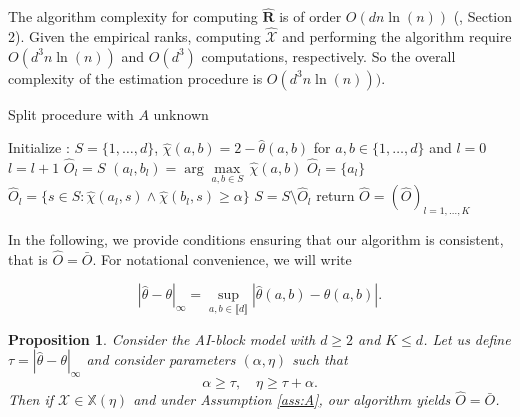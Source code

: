 \documentclass[11pt]{article}
\newtheorem{proposition}{Proposition}
\theoremstyle{definition}
\begin{document}
	The algorithm complexity for computing $\hat{\textbf{R}}$ is of order $O(dn \ln(n))$ (\cite{cormen2022introduction}, Section 2). Given the empirical ranks, computing $\hat{\mathcal{X}}$ and performing the algorithm require $O(d^3 n \ln(n))$ and $O(d^3)$ computations, respectively. So the overall complexity of the estimation procedure is $O(d^3 n \ln (n)))$.
	\begin{algorithm}
	
	\caption{Split procedure with $A$ unknown}

\begin{algorithmic}[1]
    \State Initialize : $S = \{1,\dots,d\}$, $\hat{\chi}(a,b) = 2 - \hat{\theta}(a,b)$ for $a,b \in \{1,\dots,d\}$ and $l = 0$
    		\State $l = l +1$
    			\State $\hat{O}_l = S$
    		\EndIf
    			\State $(a_l, b_l) = \arg \underset{a,b \in S}{\max} \, \hat{\chi}(a,b)$
    				\State $\hat{O}_l = \{a_l\}$
    			\EndIf
    				\State $\hat{O}_l = \{ s \in S : \hat{\chi}(a_l,s) \wedge \hat{\chi}(b_l,s) \geq \alpha \}$
    			\EndIf
    		\EndIf
    		\State $S = S \setminus \hat{O}_l$
    	\EndWhile
    \State return $\hat{O} = (\hat{O})_{l = 1, \dots,K}$
\EndProcedure
\end{algorithmic}
\label{alg:rec_pratic}
\end{algorithm}

	In the following, we provide conditions ensuring that our algorithm is consistent, that is $\hat{O} = \bar{O}$. For notational convenience, we will write
	
	\begin{equation*}
		|\hat{\theta} - \theta |_{\infty} = \underset{a,b \in \llbracket d \rrbracket}{\sup} |\hat{\theta}(a,b) - \theta(a,b)|.
	\end{equation*}
	
	\begin{proposition}
		\label{prop:exact_recovery}
		Consider the AI-block model with $d \geq 2$ and $K \leq d$. Let us define $\tau = |\hat{\theta} - \theta|_{\infty}$ and consider parameters $(\alpha, \eta)$ such that
		\begin{equation}
			\label{eq:condition_consistent_recovery}
			\alpha \geq \tau, \quad \eta \geq \tau + \alpha.
		\end{equation}
		Then if $\mathcal{X} \in \mathbb{X}(\eta)$ and under Assumption \ref{ass:A}, our algorithm yields $\hat{O} = \bar{O}$.
	\end{proposition}
	
\end{document}

